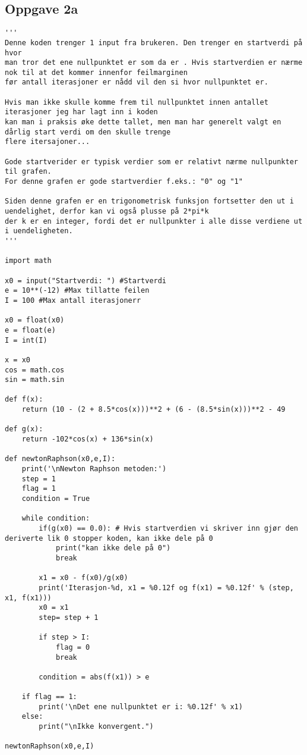 \subsection{Oppgave 2a}
\begin{lstlisting}
'''
Denne koden trenger 1 input fra brukeren. Den trenger en startverdi på hvor
man tror det ene nullpunktet er som da er . Hvis startverdien er nærme nok til at det kommer innenfor feilmarginen
før antall iterasjoner er nådd vil den si hvor nullpunktet er.

Hvis man ikke skulle komme frem til nullpunktet innen antallet iterasjoner jeg har lagt inn i koden
kan man i praksis øke dette tallet, men man har generelt valgt en dårlig start verdi om den skulle trenge
flere itersajoner...

Gode startverider er typisk verdier som er relativt nærme nullpunkter til grafen. 
For denne grafen er gode startverdier f.eks.: "0" og "1"

Siden denne grafen er en trigonometrisk funksjon fortsetter den ut i uendelighet, derfor kan vi også plusse på 2*pi*k
der k er en integer, fordi det er nullpunkter i alle disse verdiene ut i uendeligheten.
'''

import math

x0 = input("Startverdi: ") #Startverdi
e = 10**(-12) #Max tillatte feilen
I = 100 #Max antall iterasjonerr

x0 = float(x0)
e = float(e)
I = int(I)

x = x0
cos = math.cos
sin = math.sin

def f(x):
    return (10 - (2 + 8.5*cos(x)))**2 + (6 - (8.5*sin(x)))**2 - 49

def g(x):
    return -102*cos(x) + 136*sin(x)

def newtonRaphson(x0,e,I):
    print('\nNewton Raphson metoden:')
    step = 1
    flag = 1
    condition = True

    while condition:
        if(g(x0) == 0.0): # Hvis startverdien vi skriver inn gjør den deriverte lik 0 stopper koden, kan ikke dele på 0
            print("kan ikke dele på 0")
            break
        
        x1 = x0 - f(x0)/g(x0)
        print('Iterasjon-%d, x1 = %0.12f og f(x1) = %0.12f' % (step, x1, f(x1)))
        x0 = x1
        step= step + 1

        if step > I:
            flag = 0
            break

        condition = abs(f(x1)) > e

    if flag == 1:
        print('\nDet ene nullpunktet er i: %0.12f' % x1)
    else:
        print("\nIkke konvergent.")

newtonRaphson(x0,e,I)
\end{lstlisting}

